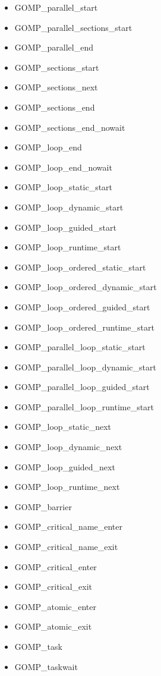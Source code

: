 \begin{itemize}
\item GOMP\_parallel\_start
\item GOMP\_parallel\_sections\_start
\item GOMP\_parallel\_end
\item GOMP\_sections\_start
\item GOMP\_sections\_next
\item GOMP\_sections\_end
\item GOMP\_sections\_end\_nowait
\item GOMP\_loop\_end
\item GOMP\_loop\_end\_nowait
\item GOMP\_loop\_static\_start
\item GOMP\_loop\_dynamic\_start
\item GOMP\_loop\_guided\_start
\item GOMP\_loop\_runtime\_start
\item GOMP\_loop\_ordered\_static\_start
\item GOMP\_loop\_ordered\_dynamic\_start
\item GOMP\_loop\_ordered\_guided\_start
\item GOMP\_loop\_ordered\_runtime\_start
\item GOMP\_parallel\_loop\_static\_start
\item GOMP\_parallel\_loop\_dynamic\_start
\item GOMP\_parallel\_loop\_guided\_start
\item GOMP\_parallel\_loop\_runtime\_start
\item GOMP\_loop\_static\_next
\item GOMP\_loop\_dynamic\_next
\item GOMP\_loop\_guided\_next
\item GOMP\_loop\_runtime\_next
\item GOMP\_barrier
\item GOMP\_critical\_name\_enter\footnotemark[4]
\item GOMP\_critical\_name\_exit\footnotemark[4]
\item GOMP\_critical\_enter\footnotemark[4]
\item GOMP\_critical\_exit\footnotemark[4]
\item GOMP\_atomic\_enter\footnotemark[4]
\item GOMP\_atomic\_exit\footnotemark[4]
\item GOMP\_task
\item GOMP\_taskwait
\end{itemize}

